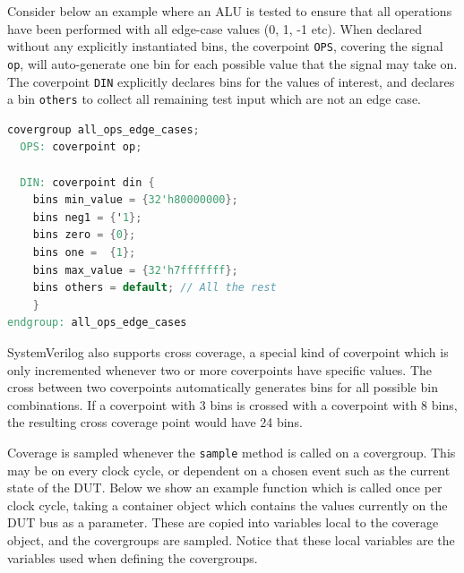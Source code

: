 \documentclass[runningheads]{llncs}
\begin{document}
Consider below an example where an ALU is tested to ensure that all operations have been performed with all edge-case values (0, 1, -1 etc).
When declared without any explicitly instantiated bins, the coverpoint \texttt{OPS}, covering the signal \texttt{op}, will auto-generate one bin for each possible value that the signal may take on. The coverpoint \texttt{DIN} explicitly declares bins for the values of interest, and declares a bin \texttt{others} to collect all remaining test input which are not an edge case.

\begin{lstlisting}[language=verilog]
covergroup all_ops_edge_cases;
  OPS: coverpoint op;

  DIN: coverpoint din {
    bins min_value = {32'h80000000};
    bins neg1 = {'1};
    bins zero = {0};
    bins one =  {1};
    bins max_value = {32'h7fffffff};
    bins others = default; // All the rest
    }
endgroup: all_ops_edge_cases
\end{lstlisting}

SystemVerilog also supports cross coverage, a special kind of coverpoint which is only incremented whenever two or more coverpoints have specific values. The cross between two coverpoints automatically generates bins for all possible bin combinations. If a coverpoint with 3 bins is crossed with a coverpoint with 8 bins, the resulting cross coverage point would have 24 bins.


%  


Coverage is sampled whenever the \texttt{sample} method is called on a covergroup. This may be on every clock cycle, or dependent on a chosen event such as the current state of the DUT. Below we show an example function which is called once per clock cycle, taking a container object which contains the values currently on the DUT bus as a parameter. These are copied into variables local to the coverage object, and the covergroups are sampled. Notice that these local variables are the variables used when defining the covergroups.
\end{document}
